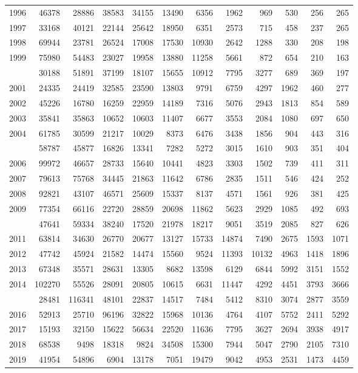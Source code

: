 \documentclass[
]{article}
\begin{document}
\begin{longtable}[t]{lrrrrrrrrrrr}
1996 & 46378 & 28886 & 38583 & 34155 & 13490 & 6356 & 1962 & 969 & 530 & 256 & 265\\
1997 & 33168 & 40121 & 22144 & 25642 & 18950 & 6351 & 2573 & 715 & 458 & 237 & 265\\
1998 & 69944 & 23781 & 26524 & 17008 & 17530 & 10930 & 2642 & 1288 & 330 & 208 & 198\\
1999 & 75980 & 54483 & 23027 & 19958 & 13880 & 11258 & 5661 & 872 & 654 & 210 & 163\\
\addlinespace
2000 & 30188 & 51891 & 37199 & 18107 & 15655 & 10912 & 7795 & 3277 & 689 & 369 & 197\\
2001 & 24335 & 24419 & 32585 & 23590 & 13803 & 9791 & 6759 & 4297 & 1962 & 460 & 277\\
2002 & 45226 & 16780 & 16259 & 22959 & 14189 & 7316 & 5076 & 2943 & 1813 & 854 & 589\\
2003 & 35841 & 35863 & 10652 & 10603 & 11407 & 6677 & 3553 & 2084 & 1080 & 697 & 650\\
2004 & 61785 & 30599 & 21217 & 10029 & 8373 & 6476 & 3438 & 1856 & 904 & 443 & 316\\
\addlinespace
2005 & 58787 & 45877 & 16826 & 13341 & 7282 & 5272 & 3015 & 1610 & 903 & 351 & 404\\
2006 & 99972 & 46657 & 28733 & 15640 & 10441 & 4823 & 3303 & 1502 & 739 & 411 & 311\\
2007 & 79613 & 75768 & 34445 & 21863 & 11642 & 6786 & 2835 & 1511 & 546 & 424 & 252\\
2008 & 92821 & 43107 & 46571 & 25609 & 15337 & 8137 & 4571 & 1561 & 926 & 381 & 425\\
2009 & 77354 & 66116 & 22720 & 28859 & 20698 & 11862 & 5623 & 2929 & 1085 & 492 & 693\\
\addlinespace
2010 & 47641 & 59334 & 38240 & 17520 & 21978 & 18217 & 9051 & 3519 & 2085 & 827 & 626\\
2011 & 63814 & 34630 & 26770 & 20677 & 13127 & 15733 & 14874 & 7490 & 2675 & 1593 & 1071\\
2012 & 47742 & 45924 & 21582 & 14474 & 15560 & 9524 & 11393 & 10132 & 4963 & 1418 & 1896\\
2013 & 67348 & 35571 & 28631 & 13305 & 8682 & 13598 & 6129 & 6844 & 5992 & 3151 & 1552\\
2014 & 102270 & 55526 & 28091 & 20805 & 10615 & 6631 & 11447 & 4292 & 4451 & 3793 & 3666\\
\addlinespace
2015 & 28481 & 116341 & 48101 & 22837 & 14517 & 7484 & 5412 & 8310 & 3074 & 2877 & 3559\\
2016 & 52913 & 25710 & 96196 & 32822 & 15968 & 10136 & 4764 & 4107 & 5752 & 2411 & 5292\\
2017 & 15193 & 32150 & 15622 & 56634 & 22520 & 11636 & 7795 & 3627 & 2694 & 3938 & 4917\\
2018 & 68538 & 9498 & 18318 & 9824 & 34508 & 15300 & 7944 & 5047 & 2790 & 2105 & 7310\\
2019 & 41954 & 54896 & 6904 & 13178 & 7051 & 19479 & 9042 & 4953 & 2531 & 1473 & 4459\\*
\end{longtable}
\end{document}
